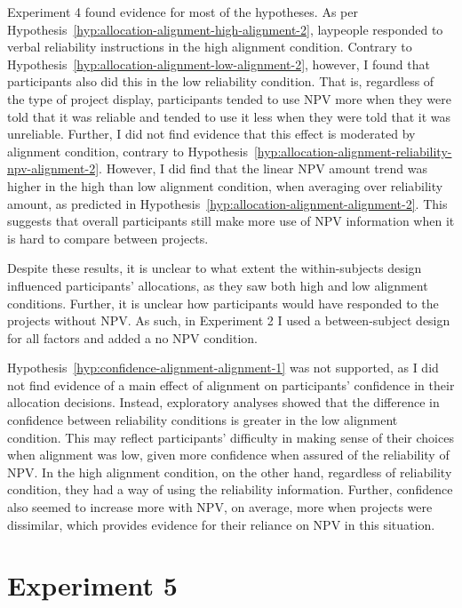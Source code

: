 \documentclass[a4paper, nobind, dvipsnames]{templates/ociamthesis}
\theoremstyle{definition}
\theoremstyle{definition}
\theoremstyle{definition}
\theoremstyle{definition}
\theoremstyle{remark}
\begin{document}
Experiment 4 found evidence for most of the hypotheses. As per
Hypothesis~\ref{hyp:allocation-alignment-high-alignment-2}, laypeople responded
to verbal reliability instructions in the high alignment condition. Contrary to
Hypothesis~\ref{hyp:allocation-alignment-low-alignment-2}, however, I found that
participants also did this in the low reliability condition. That is, regardless
of the type of project display, participants tended to use NPV more when they
were told that it was reliable and tended to use it less when they were told
that it was unreliable. Further, I did not find evidence that this effect is
moderated by alignment condition, contrary to
Hypothesis~\ref{hyp:allocation-alignment-reliability-npv-alignment-2}. However,
I did find that the linear NPV amount trend was higher in the high than low
alignment condition, when averaging over reliability amount, as predicted in
Hypothesis~\ref{hyp:allocation-alignment-alignment-2}. This suggests that
overall participants still make more use of NPV information when it is hard to
compare between projects.

Despite these results, it is unclear to what extent the within-subjects design
influenced participants' allocations, as they saw both high and low alignment
conditions. Further, it is unclear how participants would have responded to the
projects without NPV. As such, in Experiment 2 I used a between-subject design
for all factors and added a no NPV condition.

Hypothesis~\ref{hyp:confidence-alignment-alignment-1} was not supported, as I
did not find evidence of a main effect of alignment on participants' confidence
in their allocation decisions. Instead, exploratory analyses showed that the
difference in confidence between reliability conditions is greater in the low
alignment condition. This may reflect participants' difficulty in making sense
of their choices when alignment was low, given more confidence when assured of
the reliability of NPV. In the high alignment condition, on the other hand,
regardless of reliability condition, they had a way of using the reliability
information. Further, confidence also seemed to increase more with NPV, on
average, more when projects were dissimilar, which provides evidence for their
reliance on NPV in this situation.

\hypertarget{alignment-4}{%
\section{Experiment 5}\label{alignment-4}}
\end{document}

